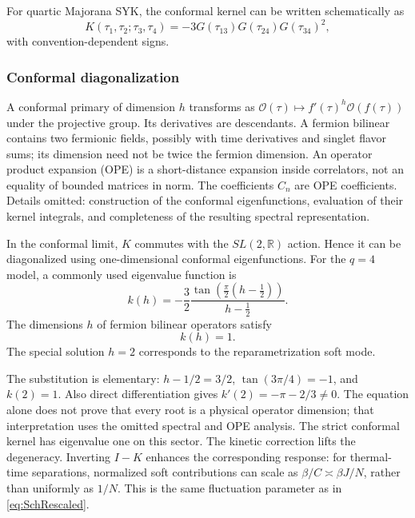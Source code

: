 \documentclass[11pt]{article}
\numberwithin{equation}{section}
\theoremstyle{exposition}
\theoremstyle{result}
\newcommand{\R}{\mathbb R}
\begin{document}
For quartic Majorana SYK, the conformal kernel can be written schematically as
\begin{equation*}
K(\tau_1,\tau_2;\tau_3,\tau_4)
=-3
G(\tau_{13})G(\tau_{24})G(\tau_{34})^2,
\end{equation*}
with convention-dependent signs.

\subsubsection{Conformal diagonalization}


A conformal primary of dimension $h$ transforms as $\mathcal O(\tau)\mapsto f'(\tau)^h\mathcal O(f(\tau))$ under the projective group. Its derivatives are descendants. A fermion bilinear contains two fermionic fields, possibly with time derivatives and singlet flavor sums; its dimension need not be twice the fermion dimension. An operator product expansion (OPE) is a short-distance expansion inside correlators, not an equality of bounded matrices in norm. The coefficients $C_n$ are OPE coefficients. Details omitted: construction of the conformal eigenfunctions, evaluation of their kernel integrals, and completeness of the resulting spectral representation.

In the conformal limit, $K$ commutes with the $SL(2,\R)$ action. Hence it can be diagonalized using one-dimensional conformal eigenfunctions. For the $q=4$ model, a commonly used eigenvalue function is
\begin{equation}
k(h)
=-\frac32
\frac{\tan\left(\frac\pi2(h-\frac12)\right)}{h-\frac12}.
\label{eq:kh}
\end{equation}
The dimensions $h$ of fermion bilinear operators satisfy
\begin{equation}
k(h)=1.
\label{eq:kh1}
\end{equation}
The special solution $h=2$ corresponds to the reparametrization soft mode.


The substitution is elementary: $h-1/2=3/2$, $\tan(3\pi/4)=-1$, and $k(2)=1$. Also direct differentiation gives $k'(2)=-\pi-2/3\ne0$. The equation alone does not prove that every root is a physical operator dimension; that interpretation uses the omitted spectral and OPE analysis. The strict conformal kernel has eigenvalue one on this sector. The kinetic correction lifts the degeneracy. Inverting $I-K$ enhances the corresponding response: for thermal-time separations, normalized soft contributions can scale as $\beta/C\asymp\beta J/N$, rather than uniformly as $1/N$. This is the same fluctuation parameter as in \eqref{eq:SchRescaled}.
\end{document}
